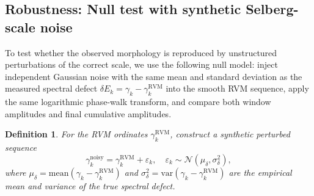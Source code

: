 \documentclass[12pt]{article}
\numberwithin{equation}{section}
\newtheorem{definition}[theorem]{Definition}
\newcommand{\mean}{\mathrm{mean}}
\begin{document}
\subsection{Robustness: Null test with synthetic Selberg-scale noise}
\label{subsec:null_test_synthetic_noise}

\noindent To test whether the observed morphology is reproduced by unstructured perturbations of the correct scale, we use the following null model: inject independent Gaussian noise with the same mean and standard deviation as the measured spectral defect $\delta E_k = \gamma_k - \gamma_k^{\text{RVM}}$ into the smooth RVM sequence, apply the same logarithmic phase-walk transform, and compare both window amplitudes and final cumulative amplitudes.

\begin{definition}
\label{def:synthetic_noise_sequence}
For the RVM ordinates $\gamma_k^{\text{RVM}}$, construct a synthetic perturbed sequence
\begin{equation}
\gamma_k^{\text{noisy}} = \gamma_k^{\text{RVM}} + \varepsilon_k,
\quad
\varepsilon_k \sim \mathcal{N}(\mu_\delta, \sigma_\delta^2),
\label{eq:synthetic_sequence}
\end{equation}
where $\mu_\delta = \mean(\gamma_k - \gamma_k^{\text{RVM}})$ and $\sigma_\delta^2 = \text{var}(\gamma_k - \gamma_k^{\text{RVM}})$ are the empirical mean and variance of the true spectral defect.
\end{definition}
\end{document}
